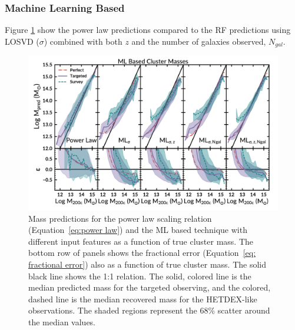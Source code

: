 \documentclass[fleqn,usenatbib]{mnras}
\newcommand{\editorial}[1]{\textcolor{red}{#1}}
\begin{document}
\subsubsection{Machine Learning Based}
Figure \ref{fig: ML comparison} show the power law predictions compared to the RF predictions using LOSVD ($\sigma$) combined with both $z$ and the number of galaxies observed, $N_{gal}$.  
\begin{figure} 
	\includegraphics[width=\textwidth]{figures/MLcomparison.pdf} 
	\caption{Mass predictions for the power law scaling relation (Equation~\ref{eq:power law}) and the ML based technique with different input features as a function of true cluster mass. The bottom row of panels shows the fractional error (Equation~\ref{eq: fractional error}) also as a function of true cluster mass. The solid black line shows the 1:1 relation. The solid, colored line is the median predicted mass for the targeted observing, and the colored, dashed line is the median recovered mass for the HETDEX-like observations. The shaded regions represent the 68\% scatter around the median values.} \label{fig: ML comparison} 
\end{figure}

\end{document}
